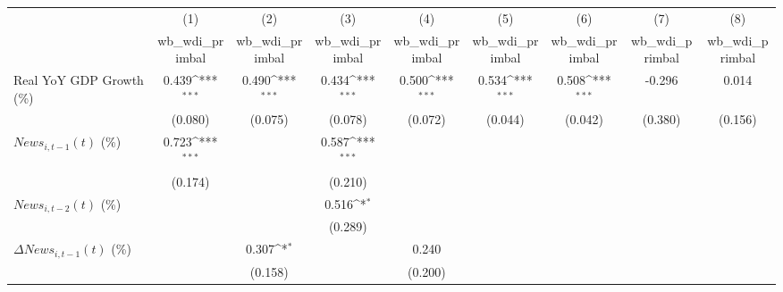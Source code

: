 {
\def\sym#1{\ifmmode^{#1}\else\(^{#1}\)\fi}
\begin{tabular}{l*{8}{c}}
\toprule
                    &\multicolumn{1}{c}{(1)}&\multicolumn{1}{c}{(2)}&\multicolumn{1}{c}{(3)}&\multicolumn{1}{c}{(4)}&\multicolumn{1}{c}{(5)}&\multicolumn{1}{c}{(6)}&\multicolumn{1}{c}{(7)}&\multicolumn{1}{c}{(8)}\\
                    &\multicolumn{1}{c}{wb_wdi_primbal}&\multicolumn{1}{c}{wb_wdi_primbal}&\multicolumn{1}{c}{wb_wdi_primbal}&\multicolumn{1}{c}{wb_wdi_primbal}&\multicolumn{1}{c}{wb_wdi_primbal}&\multicolumn{1}{c}{wb_wdi_primbal}&\multicolumn{1}{c}{wb_wdi_primbal}&\multicolumn{1}{c}{wb_wdi_primbal}\\
\midrule
Real YoY GDP Growth (\%)&       0.439\sym{***}&       0.490\sym{***}&       0.434\sym{***}&       0.500\sym{***}&       0.534\sym{***}&       0.508\sym{***}&      -0.296         &       0.014         \\
                    &     (0.080)         &     (0.075)         &     (0.078)         &     (0.072)         &     (0.044)         &     (0.042)         &     (0.380)         &     (0.156)         \\
\addlinespace
$ News_{i,t-1}(t)$ (\%)&       0.723\sym{***}&                     &       0.587\sym{***}&                     &                     &                     &                     &                     \\
                    &     (0.174)         &                     &     (0.210)         &                     &                     &                     &                     &                     \\
\addlinespace
$ News_{i,t-2}(t)$ (\%)&                     &                     &       0.516\sym{*}  &                     &                     &                     &                     &                     \\
                    &                     &                     &     (0.289)         &                     &                     &                     &                     &                     \\
\addlinespace
$ \Delta News_{i,t-1}(t)$ (\%)&                     &       0.307\sym{*}  &                     &       0.240         &                     &                     &                     &                     \\
                    &                     &     (0.158)         &                     &     (0.200)         &                     &                     &                     &                     \\

\end{tabular}}
